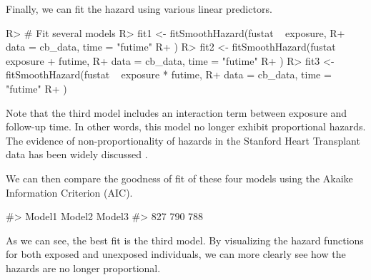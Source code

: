 \documentclass[
]{jss}
\begin{document}
Finally, we can fit the hazard using various linear predictors.

\begin{CodeChunk}

\begin{CodeInput}
R> # Fit several models
R> fit1 <- fitSmoothHazard(fustat ~ exposure,
R+   data = cb_data, time = "futime"
R+ )
R> fit2 <- fitSmoothHazard(fustat ~ exposure + futime,
R+   data = cb_data, time = "futime"
R+ )
R> fit3 <- fitSmoothHazard(fustat ~ exposure * futime,
R+   data = cb_data, time = "futime"
R+ )
\end{CodeInput}
\end{CodeChunk}

Note that the third model includes an interaction term between exposure
and follow-up time. In other words, this model no longer exhibit
proportional hazards. The evidence of non-proportionality of hazards in
the Stanford Heart Transplant data has been widely discussed
\citep{arjas1988graphical}.

We can then compare the goodness of fit of these four models using the
Akaike Information Criterion (AIC).

\begin{CodeChunk}

\begin{CodeOutput}
#> Model1 Model2 Model3 
#>    827    790    788
\end{CodeOutput}
\end{CodeChunk}

As we can see, the best fit is the third model. By visualizing the
hazard functions for both exposed and unexposed individuals, we can more
clearly see how the hazards are no longer proportional.
\end{document}
